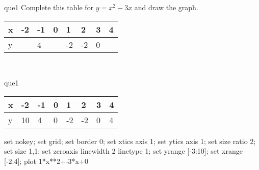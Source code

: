 \documentclass[13.5pt, varwidth=true]{beamer}
\begin{document}
\begin{frame}[shrink=19,fragile]
	\begin{beamercolorbox}[rounded=true, left, shadow=true,wd=14.8cm]{que1}
		 Complete this table for $y = x^{2} - 3x$ and draw the graph. \\[0.3cm] \renewcommand{\arraystretch}{1.2}\begin{tabular}{|C|C|C|C|C|C|C|C|} \hline x & -2 & -1 & 0 & 1 & 2 & 3 & 4 \\ \hline y &  & 4 &  & -2 & -2 & 0 & \\ \hline \end{tabular}\\[0.3cm]
	\end{beamercolorbox}
\end{frame}
\begin{frame}[shrink=19,fragile]
	\begin{beamercolorbox}[rounded=true, left, shadow=true,wd=14.8cm]{que1}
		\renewcommand{\arraystretch}{1.2}\begin{tabular}{|C|C|C|C|C|C|C|C|} \hline x & -2 & -1 & 0 & 1 & 2 & 3 & 4 \\ \hline y & 10 & 4 & 0 & -2 & -2 & 0 & 4\\ \hline \end{tabular}\begin{gnuplot}[terminal=pdf] set nokey; set grid; set border 0; set xtics axis 1; set ytics axis 1; set size ratio 2; set size 1,1; set zeroaxis linewidth 2 linetype 1; set yrange [-3:10]; set xrange [-2:4]; plot 1*x**2+-3*x+0 \end{gnuplot}
	\end{beamercolorbox}
\end{frame}
\end{document}
